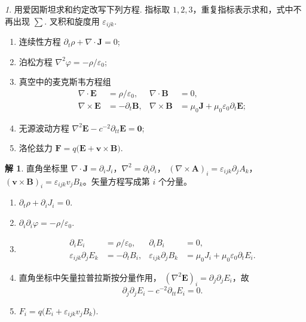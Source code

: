 \documentclass[11pt]{article}
\theoremstyle{remark}
\newtheorem{problem}{}
\theoremstyle{definition}
\newtheorem{solution}{解}
\begin{document}
\renewcommand{\labelenumi}{(\arabic{enumi})}
\renewcommand{\labelenumii}{(\arabic{enumi}.\arabic{enumii})}

\begin{problem}
  用爱因斯坦求和约定改写下列方程. 指标取 $1,2,3$，重复指标表示求和，式中不再出现 $\sum$. 叉积和旋度用 $\varepsilon_{ijk}$.
  \begin{enumerate}
    \item 连续性方程 $\partial_t\rho+\nabla\cdot\mathbf{J}=0$;
    \item 泊松方程 $\nabla^2\varphi=-\rho/\varepsilon_0$;
    \item 真空中的麦克斯韦方程组
      \[
        \begin{aligned}
          \nabla\cdot\mathbf{E}&=\rho/\varepsilon_0, &
          \nabla\cdot\mathbf{B}&=0,\\
          \nabla\times\mathbf{E}&=-\partial_t\mathbf{B}, &
          \nabla\times\mathbf{B}
          &=\mu_0\mathbf{J}+\mu_0\varepsilon_0\partial_t\mathbf{E};
        \end{aligned}
      \]
    \item 无源波动方程
      $\nabla^2\mathbf{E}-c^{-2}\partial_{tt}\mathbf{E}=\mathbf{0}$;
    \item 洛伦兹力
      $\mathbf{F}=q\bigl(\mathbf{E}+\mathbf{v}\times\mathbf{B}\bigr)$.
  \end{enumerate}
\end{problem}

\begin{solution}
直角坐标里 $\nabla\cdot\mathbf{J}=\partial_i J_i$，$\nabla^2=\partial_i\partial_i$，
$(\nabla\times\mathbf{A})_i=\varepsilon_{ijk}\partial_j A_k$，
$(\mathbf{v}\times\mathbf{B})_i=\varepsilon_{ijk}v_j B_k$。矢量方程写成第 $i$ 个分量。

\begin{enumerate}
  \item $\partial_t\rho+\partial_i J_i=0$.
  \item $\partial_i\partial_i\varphi=-\rho/\varepsilon_0$.
  \item
    \[
      \begin{aligned}
        \partial_i E_i&=\rho/\varepsilon_0, &
        \partial_i B_i&=0,\\
        \varepsilon_{ijk}\partial_j E_k&=-\partial_t B_i, &
        \varepsilon_{ijk}\partial_j B_k
        &=\mu_0 J_i+\mu_0\varepsilon_0\partial_t E_i.
      \end{aligned}
    \]
  \item 直角坐标中矢量拉普拉斯按分量作用，
    $(\nabla^2\mathbf{E})_i=\partial_j\partial_j E_i$，故
    \[
      \partial_j\partial_j E_i-c^{-2}\partial_{tt}E_i=0.
    \]
  \item $F_i=q\bigl(E_i+\varepsilon_{ijk}v_j B_k\bigr)$.
\end{enumerate}
\end{solution}
\end{document}
